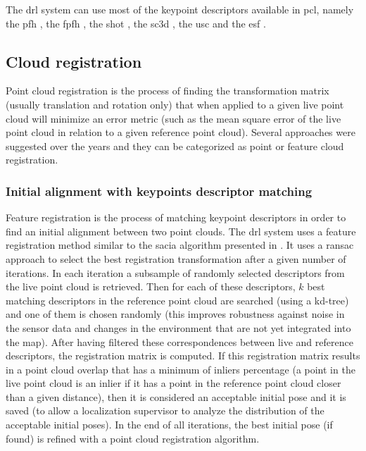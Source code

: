The \gls{drl} system can use most of the keypoint descriptors available in \gls{pcl}, namely the \gls{pfh} \cite{Rusu2008a}, the \gls{fpfh} \cite{Rusu2009}, the \gls{shot} \cite{Tombari2011}, the \gls{sc3d} \cite{Frome2004}, the \gls{usc} \cite{Tombari2010} and the \gls{esf} \cite{Wohlkinger2011}.


\subsection{Cloud registration}

Point cloud registration is the process of finding the transformation matrix (usually translation and rotation only) that when applied to a given live point cloud will minimize an error metric (such as the mean square error of the live point cloud in relation to a given reference point cloud). Several approaches were suggested over the years and they can be categorized as point or feature cloud registration.


\subsubsection{Initial alignment with keypoints descriptor matching}\label{subsec:localization-system_feature-registration}

Feature registration is the process of matching keypoint descriptors in order to find an initial alignment between two point clouds. The \gls{drl} system uses a feature registration method similar to the \gls{sacia} algorithm presented in \cite{Rusu2009}. It uses a \gls{ransac} approach to select the best registration transformation after a given number of iterations. In each iteration a subsample of randomly selected descriptors from the live point cloud is retrieved. Then for each of these descriptors, $k$ best matching descriptors in the reference point cloud are searched (using a kd-tree) and one of them is chosen randomly (this improves robustness against noise in the sensor data and changes in the environment that are not yet integrated into the map). After having filtered these correspondences between live and reference descriptors, the registration matrix is computed. If this registration matrix results in a point cloud overlap that has a minimum of inliers percentage (a point in the live point cloud is an inlier if it has a point in the reference point cloud closer than a given distance), then it is considered an acceptable initial pose and it is saved (to allow a localization supervisor to analyze the distribution of the acceptable initial poses). In the end of all iterations, the best initial pose (if found) is refined with a point cloud registration algorithm.


